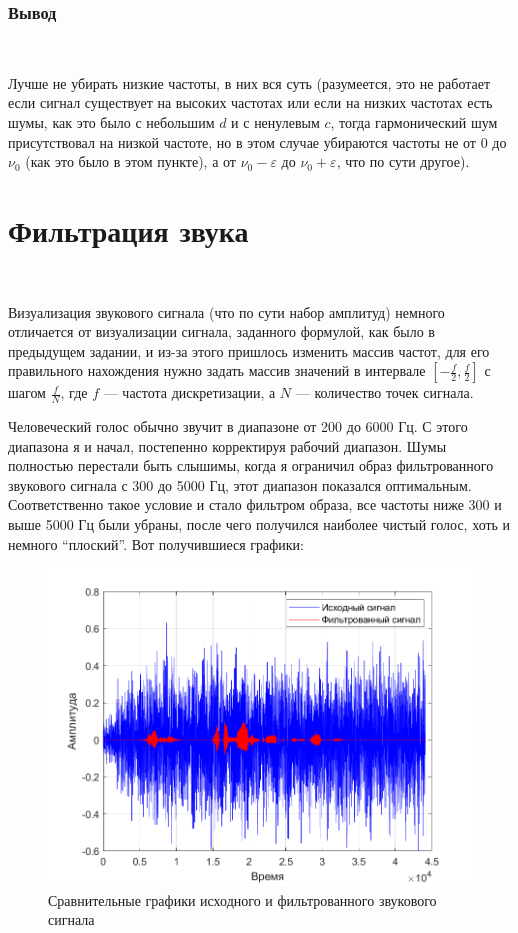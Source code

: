 \documentclass[a4paper]{article}
\begin{document}
\subsubsection{Вывод}\

Лучше не убирать низкие частоты, в них вся суть (разумеется, это не работает если сигнал существует на высоких частотах или если на низких частотах есть шумы, как это было с небольшим $d$ и с ненулевым $c$, тогда гармонический шум присутствовал на низкой частоте, но в этом случае убираются частоты не от 0 до $\nu_0$ (как это было в этом пункте), а от $\nu_0-\varepsilon$ до $\nu_0+\varepsilon$, что по сути другое).

\section{Фильтрация звука}\

Визуализация звукового сигнала (что по сути набор амплитуд) немного отличается от визуализации сигнала, заданного формулой, как было в предыдущем задании, и из-за этого пришлось изменить массив частот, для его правильного нахождения нужно задать массив значений в интервале $[-\frac{f}{2}, \frac{f}{2}]$ с шагом $\frac{f}{N}$, где $f$ --- частота дискретизации, а $N$ --- количество точек сигнала.\

Человеческий голос обычно звучит в диапазоне от 200 до 6000 Гц. С этого диапазона я и начал, постепенно корректируя рабочий диапазон. Шумы полностью перестали быть слышимы, когда я ограничил образ фильтрованного звукового сигнала с 300 до 5000 Гц, этот диапазон показался оптимальным. Соответственно такое условие и стало фильтром образа, все частоты ниже 300 и выше 5000 Гц были убраны, после чего получился наиболее чистый голос, хоть и немного ``плоский''. Вот получившиеся графики:\

\begin{figure}[H]
    \centering
    \includegraphics[width=0.5\linewidth]{ex2/sound.png}
    \caption{Сравнительные графики исходного и фильтрованного звукового сигнала}
\end{figure}
\end{document}

